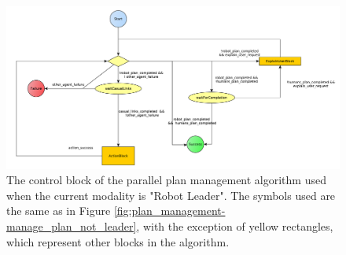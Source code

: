 \begin{figure}[ht!]
 \centering
 \includegraphics[]{img/plan_management/manage_plan_leader_control_block.pdf}
 \caption{The control block of the parallel plan management algorithm used when the current modality is "Robot Leader". The symbols used are the same as in Figure \ref{fig:plan_management-manage_plan_not_leader}, with the exception of yellow rectangles, which represent other blocks in the algorithm.}
 \label{fig:plan_management-manage_plan_leader_control_block}
 \end{figure}


